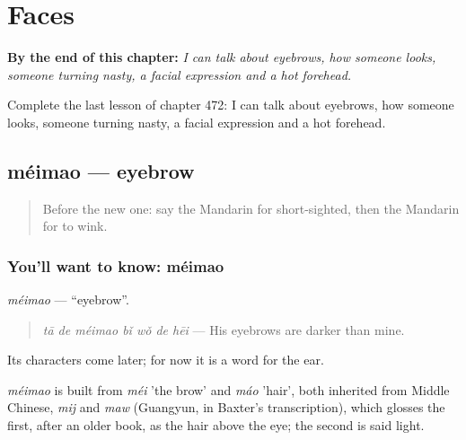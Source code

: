 
\chapter{Faces}
\label{ch:zh-faces}

\begin{chapteropening}
\textbf{By the end of this chapter:} \emph{I can talk about eyebrows, how someone looks, someone turning nasty, a facial expression and a hot forehead.}

Complete the last lesson of chapter 472: I can talk about eyebrows, how someone looks, someone turning nasty, a facial expression and a hot forehead.
\end{chapteropening}

\section[méimao]{méimao — eyebrow}

\label{lesson:ZH-C472-meimao}



\begin{quote}
Before the new one: say the Mandarin for short-sighted, then the Mandarin for to wink.
\end{quote}

\subsection*{You'll want to know: méimao}
\emph{méimao} — \textquotedblleft{}eyebrow\textquotedblright{}.

\begin{quote}
\emph{tā de méimao bǐ wǒ de hēi} — His eyebrows are darker than mine.
\end{quote}

Its characters come later; for now it is a word for the ear.

\begin{cousinweb}
\emph{méimao} is built from \emph{méi} 'the brow' and \emph{máo} 'hair', both inherited from Middle Chinese, \emph{mij} and \emph{maw} (Guangyun, in Baxter's transcription), which glosses the first, after an older book, as the hair above the eye; the second is said light.
\end{cousinweb}

